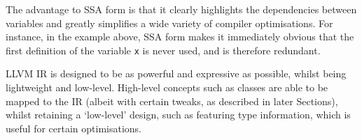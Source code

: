The advantage to SSA form is that it clearly highlights the dependencies between variables and greatly simplifies a wide variety of compiler optimisations. For instance, in the example above, SSA form makes it immediately obvious that the first definition of the variable \verb|x| is never used, and is therefore redundant.

LLVM IR is designed to be as powerful and expressive as possible, whilst being lightweight and low-level. High-level concepts such as classes are able to be mapped to the IR (albeit with certain tweaks, as described in later Sections), whilst retaining a `low-level' design, such as featuring type information, which is useful for certain optimisations.
